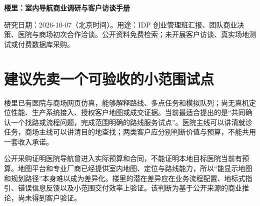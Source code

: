 \documentclass[UTF8,10pt,fontset=fandol]{ctexart}
\begin{document}
{\fontsize{24}{32}\selectfont\bfseries 楼里：室内导航商业调研与客户访谈手册\par}\vspace{8pt}
研究日期：2026-10-07（北京时间）。用途：IDP 创业管理班汇报、团队商业决策、医院与商场初次合作洽谈。公开资料免费检索；未开展客户访谈、真实场地测试或付费数据库采购。\par
\section*{建议先卖一个可验收的小范围试点}
楼里已有医院与商场网页仿真，能够解释路线、多点任务和模拟队列；尚无真机定位性能、生产系统接入、授权客户地图或成交证据。当前最适合提出的是“共同确认一个找路或流程问题，完成范围明确的路线服务试点”。医院主线可以讲清就诊任务，商场主线可以讲清目的地查找；两类客户应分别判断价值与预算，不能共用一套收入承诺。\par
公开采购证明医院导航曾进入实际预算和合同，不能证明本地目标医院当前有预算。地图平台和专业厂商已经提供室内地图、定位与路线能力，所以“能显示地图和规划路径”本身难以成为差异化。楼里的潜在差异应在业务流程配置、地标式指引、错误信息反馈以及小范围交付效率上验证。该判断为基于公开来源的商业推论，尚未得到客户验证。\par
\end{document}
